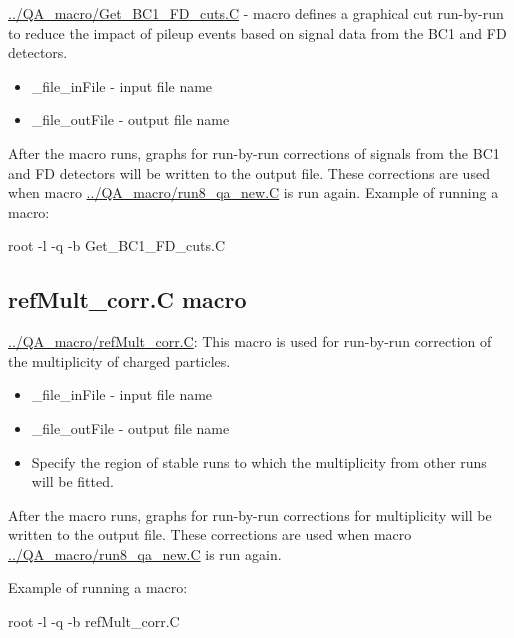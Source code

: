     \url{../QA_macro/Get_BC1_FD_cuts.C} - macro defines a graphical cut run-by-run to reduce the impact of pileup events based on signal data from the BC1 and FD detectors.
    \begin{itemize}
        \item \_file\_inFile - input file name
        \item \_file\_outFile - output file name
    \end{itemize}
    After the macro runs, graphs for run-by-run corrections of signals from the BC1 and FD detectors will be written to the output file. 
    These corrections are used when macro \url{../QA_macro/run8_qa_new.C} is run again.
    Example of running a macro:
    
    root -l -q -b Get\_BC1\_FD\_cuts.C



\subsection{refMult\_corr.C macro}\label{CorrRefMult}

   \url{../QA_macro/refMult_corr.C}: This macro is used for run-by-run correction of the multiplicity of charged particles.
    \begin{itemize}
        \item \_file\_inFile - input file name
        \item \_file\_outFile - output file name
        \item Specify the region of stable runs to which the multiplicity from other runs will be fitted.
    \end{itemize}
    After the macro runs, graphs for run-by-run corrections for multiplicity will be written to the output file.
    These corrections are used when macro \url{../QA_macro/run8_qa_new.C} is run again.

    Example of running a macro:
    
    root -l -q -b refMult\_corr.C

